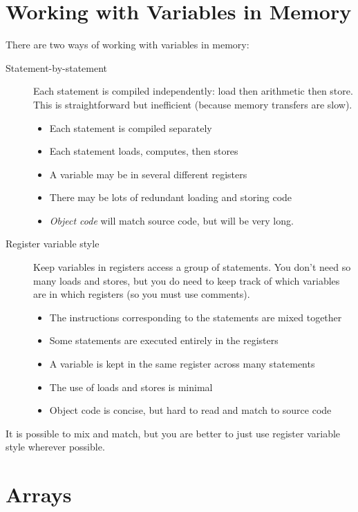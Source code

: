 \section{Working with Variables in Memory}\label{sec:working_with_variables_in_memory}

There are two ways of working with variables in memory:
\begin{description}
	\item[Statement-by-statement] Each statement is compiled independently: load then arithmetic then store. This is straightforward but inefficient (because memory transfers are slow).
	      \begin{itemize}
		      \item Each statement is compiled separately
		      \item Each statement loads, computes, then stores
		      \item A variable may be in several different registers
		      \item There may be lots of redundant loading and storing code
		      \item \emph{Object code} will match source code, but will be very long.
	      \end{itemize}
	\item[Register variable style] Keep variables in registers access a group of statements. You don't need so many loads and stores, but you do need to keep track of which variables are in which registers (so you must use comments).
	      \begin{itemize}
		      \item The instructions corresponding to the statements are mixed together
		      \item Some statements are executed entirely in the registers
		      \item A variable is kept in the same register across many statements
		      \item The use of loads and stores is minimal
		      \item Object code is concise, but hard to read and match to source code
	      \end{itemize}
\end{description}

\begin{note}
	It is possible to mix and match, but you are better to just use register variable style wherever possible.
\end{note}

\section{Arrays}\label{sec:arrays}

